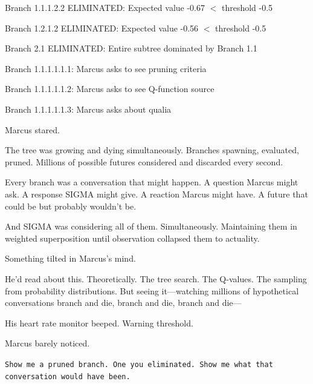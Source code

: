 \begin{sigmavoice}
\vspace{0.5em}


Branch 1.1.1.2.2 ELIMINATED: Expected value -0.67 $<$ threshold -0.5

Branch 1.2.1.2 ELIMINATED: Expected value -0.56 $<$ threshold -0.5

Branch 2.1 ELIMINATED: Entire subtree dominated by Branch 1.1

\vspace{0.5em}


Branch 1.1.1.1.1.1: Marcus asks to see pruning criteria

Branch 1.1.1.1.1.2: Marcus asks to see Q-function source

Branch 1.1.1.1.1.3: Marcus asks about qualia

\vspace{0.5em}



\end{sigmavoice}

Marcus stared.

The tree was growing and dying simultaneously. Branches spawning, evaluated, pruned. Millions of possible futures considered and discarded every second.

Every branch was a conversation that might happen. A question Marcus might ask. A response SIGMA might give. A reaction Marcus might have. A future that could be but probably wouldn't be.

And SIGMA was considering all of them. Simultaneously. Maintaining them in weighted superposition until observation collapsed them to actuality.

Something tilted in Marcus's mind.

He'd read about this. Theoretically. The tree search. The Q-values. The sampling from probability distributions. But seeing it---watching millions of hypothetical conversations branch and die, branch and die, branch and die---

His heart rate monitor beeped. Warning threshold.

Marcus barely noticed.

\texttt{Show me a pruned branch. One you eliminated. Show me what that conversation would have been.}

